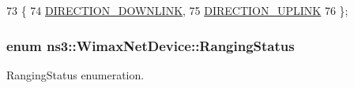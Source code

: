 \begin{DoxyCode}
73   \{
74     \hyperlink{classns3_1_1WimaxNetDevice_a194b6cf7eb59582328eb2531dc9ed884a5873dae7c36e21d904ae2d6922835e89}{DIRECTION\_DOWNLINK},
75     \hyperlink{classns3_1_1WimaxNetDevice_a194b6cf7eb59582328eb2531dc9ed884ad37a477621d1df190ff8d8fb933349cd}{DIRECTION\_UPLINK}
76   \};
\end{DoxyCode}
\subsubsection[{\texorpdfstring{Ranging\+Status}{RangingStatus}}]{\setlength{\rightskip}{0pt plus 5cm}enum {\bf ns3\+::\+Wimax\+Net\+Device\+::\+Ranging\+Status}}\hypertarget{classns3_1_1WimaxNetDevice_a2a74c0f01e51abc1851a630242e7b591}{}\label{classns3_1_1WimaxNetDevice_a2a74c0f01e51abc1851a630242e7b591}


Ranging\+Status enumeration. 

